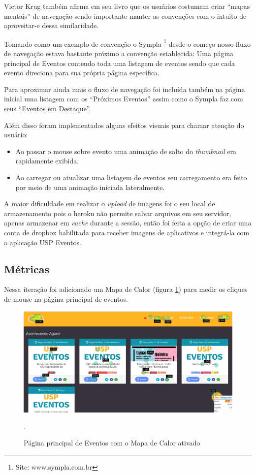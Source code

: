 	\par Victor Krug também afirma em seu livro que os usuários costumam criar ``mapas mentais'' de navegação sendo importante manter as convenções com o intuito de aproveitar-e dessa similaridade.
	\par Tomando como um exemplo de convenção o Sympla \footnote{Site: www.sympla.com.br} desde o começo nosso fluxo de navegação estava bastante próximo a convenção establecida: Uma página principal de Eventos contendo toda uma listagem de eventos sendo que cada evento direciona para sua própria página específica.
	\par Para aproximar ainda mais o fluxo de navegação foi incluída também na página inicial uma listagem com os ``Próximos Eventos'' assim como o Sympla faz com seus ``Eventos em Destaque''.
	\par Além disso foram implementados alguns efeitos visuais para chamar atenção do usuário:
	\begin{itemize}
	\item Ao passar o mouse sobre evento uma animação de salto do \emph{thumbnail} era rapidamente exibida.
	\item Ao carregar ou atualizar uma listagem de eventos seu carregamento era feito por meio de uma animação iniciada lateralmente.
	\end{itemize}
	\par A maior dificuldade em realizar o \emph{upload} de imagens foi o seu local de armazenamento pois o heroku não permite salvar arquivos em seu servidor, apenas armazenar em \emph{cache} durante a sessão, então foi feita a opção de criar uma conta de dropbox habilitada para receber imagens de aplicativos e integrá-la com a aplicação USP Eventos.

\subsection{Métricas}

\par Nessa iteração foi adicionado um Mapa de Calor (figura \ref{fig:heatmap}) para medir os cliques de mouse na página principal de eventos.
\begin{figure}[htb]
\centering
\includegraphics[width=15cm]{figuras/heatmap}
\caption{\label{fig:heatmap} Página principal de Eventos com o Mapa de Calor ativado}.
\end{figure}

